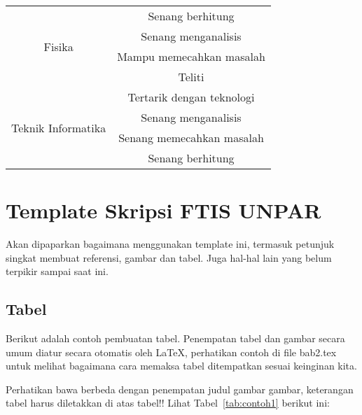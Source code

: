 \begin{table}[H]
\begin{tabular}{| c | c |}
		\hline
		\multirow{4}{10em}{Fisika} & Senang berhitung \\
		& Senang menganalisis \\
		& Mampu memecahkan masalah\\
		& Teliti \\
		
		\hline
		\multirow{4}{10em}{Teknik Informatika} & Tertarik dengan teknologi \\
		& Senang menganalisis \\
		& Senang memecahkan masalah \\
		& Senang berhitung \\
		
		\hline
	\end{tabular} 
\end{table}


\section{Template Skripsi FTIS UNPAR}
\label{sec:template}
 
Akan dipaparkan bagaimana menggunakan template ini, termasuk petunjuk singkat membuat referensi, gambar dan tabel.
Juga hal-hal lain yang belum terpikir sampai saat ini. 
 

\subsection{Tabel}  
Berikut adalah contoh pembuatan tabel. 
Penempatan tabel dan gambar secara umum diatur secara otomatis oleh \LaTeX{}, perhatikan contoh di file bab2.tex untuk melihat bagaimana cara memaksa tabel ditempatkan sesuai keinginan kita.

Perhatikan bawa berbeda dengan penempatan judul gambar gambar, keterangan tabel harus diletakkan di atas tabel!!
Lihat Tabel~\ref{tab:contoh1} berikut ini:

